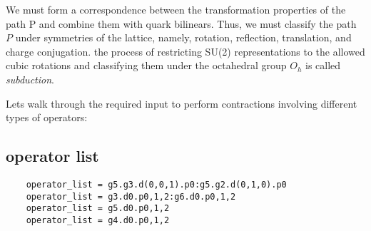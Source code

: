 We must form a correspondence between the transformation properties of the path P and combine them with quark bilinears. Thus, we must classify the path $P$ under symmetries of the lattice, namely, rotation, reflection, translation, and charge conjugation. the process of restricting SU(2) representations to the allowed cubic rotations and classifying them under the octahedral group $O_h$ is called \textit{subduction}. 

Lets walk through the required input to perform contractions involving different types of operators:

\subsection{operator list}
\begin{verbatim}
    operator_list = g5.g3.d(0,0,1).p0:g5.g2.d(0,1,0).p0
    operator_list = g3.d0.p0,1,2:g6.d0.p0,1,2
    operator_list = g5.d0.p0,1,2
    operator_list = g4.d0.p0,1,2    
\end{verbatim}


